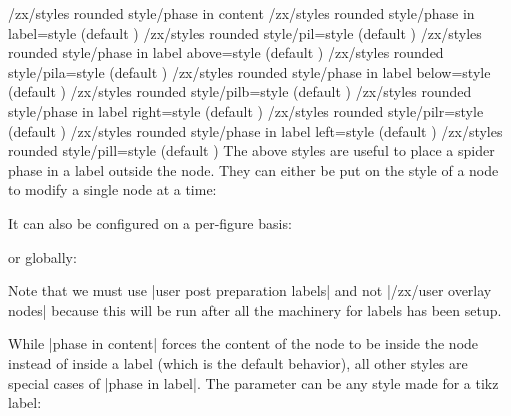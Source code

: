 \documentclass[a4paper]{ltxdoc}
\begin{document}
{\begin{pgfmanualentry}
  \makeatletter
  \def\extrakeytext{style, }
  \extractkey/zx/styles rounded style/phase in content\@nil%
  \extractkey/zx/styles rounded style/phase in label=style (default {})\@nil%
  \extractkey/zx/styles rounded style/pil=style (default {})\@nil%
  \extractkey/zx/styles rounded style/phase in label above=style (default {})\@nil%
  \extractkey/zx/styles rounded style/pila=style (default {})\@nil%
  \extractkey/zx/styles rounded style/phase in label below=style (default {})\@nil%
  \extractkey/zx/styles rounded style/pilb=style (default {})\@nil%
  \extractkey/zx/styles rounded style/phase in label right=style (default {})\@nil%
  \extractkey/zx/styles rounded style/pilr=style (default {})\@nil%
  \extractkey/zx/styles rounded style/phase in label left=style (default {})\@nil%
  \extractkey/zx/styles rounded style/pill=style (default {})\@nil%
  \makeatother
  \pgfmanualbody
  The above styles are useful to place a spider phase in a label outside the node. They can either be put on the style of a node to modify a single node at a time:
\begin{codeexample}[]
\end{codeexample}
\noindent It can also be configured on a per-figure basis:
\begin{codeexample}[]
\end{codeexample}
\noindent or globally:
\begin{codeexample}[]
{
}
\end{codeexample}
Note that we must use |user post preparation labels| and not |/zx/user overlay nodes| because this will be run after all the machinery for labels has been setup.

  While |phase in content| forces the content of the node to be inside the node instead of inside a label (which is the default behavior), all other styles are special cases of |phase in label|. The  parameter can be any style made for a tikz label:
\begin{codeexample}[width=3cm]
  \zx{
    \zxX[phase in label={label position=45, text=purple}]{\alpha}
  }
\end{codeexample}


\end{pgfmanualentry}}
\end{document}
